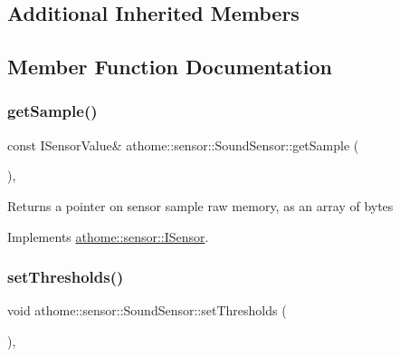\subsection*{Additional Inherited Members}


\subsection{Member Function Documentation}
\mbox{\label{classathome_1_1sensor_1_1_sound_sensor_a8ac5f417eee873247aff8a7e96e12817}} 
\subsubsection{\texorpdfstring{get\+Sample()}{getSample()}}
{\footnotesize\ttfamily const I\+Sensor\+Value\& athome\+::sensor\+::\+Sound\+Sensor\+::get\+Sample (\begin{DoxyParamCaption}{ }\end{DoxyParamCaption})\hspace{0.3cm}{\ttfamily [inline]}, {\ttfamily [virtual]}}

Returns a pointer on sensor sample raw memory, as an array of bytes 

Implements \mbox{\hyperlink{classathome_1_1sensor_1_1_i_sensor_ae109cd3741ea9c88dc7e4f2eaf1485d5}{athome\+::sensor\+::\+I\+Sensor}}.

\mbox{\label{classathome_1_1sensor_1_1_sound_sensor_adaf42abe0443f486361656efe9587ba7}} 
\subsubsection{\texorpdfstring{set\+Thresholds()}{setThresholds()}}
{\footnotesize\ttfamily void athome\+::sensor\+::\+Sound\+Sensor\+::set\+Thresholds (\begin{DoxyParamCaption}\item[{const \mbox{\hyperlink{structathome_1_1sensor_1_1_i_sensor_1_1_i_sensor_thresholds}{I\+Sensor\+Thresholds}} \&}]{ }\end{DoxyParamCaption})\hspace{0.3cm}{\ttfamily [inline]}, {\ttfamily [virtual]}}

